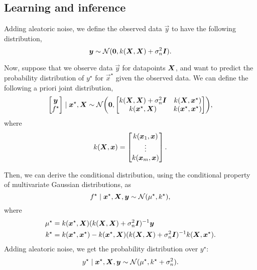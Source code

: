 \subsection{Learning and inference}

Adding aleatoric noise, we define the observed data $\vec{y}$ to have the
following distribution, \[
  \bm{y} \sim \mathcal{N}(\bm{0}, k(\bm{X}, \bm{X}) + \sigma_n^2\bm{I})
.\]

Now, suppose that we observe data $\vec{y}$ for datapoints $\bm{X}$, and want
to predict the probability distribution of $y^\star$ for $\vec{x}^\star$ given
the observed data. We can define the following a priori joint
distribution, \[
  \begin{bmatrix}
    \vec{y} \\
    f^\star
  \end{bmatrix} \mid \vec{x}^\star, \vec{X}
  \sim
  \mathcal{N} \lft(
  \vec{0},
  \begin{bmatrix}
    k(\mat{X},\mat{X}) + \sigma_n^2\mat{I} & k(\mat{X},\vec{x}^\star) \\
    k(\vec{x}^\star,\mat{X}) & k(\vec{x}^\star, \vec{x}^\star)
  \end{bmatrix} \rgt)
,\]
where \[
  k(\bm{X},\bm{x}) = \begin{bmatrix} k(\bm{x}_1,\bm{x}) \\ \vdots \\
  k(\bm{x}_m,\bm{x}) \end{bmatrix}
.\]

Then, we can derive the conditional distribution, using the conditional
property of multivariate Gaussian distributions, as \[
  f^\star \mid \bm{x}^\star, \bm{X}, \bm{y} \sim \mathcal{N}(\mu^\star,k^\star)
,\]
where
\begin{align*}
  \mu^\star &= k(\bm{x}^\star, \bm{X}) (k(\bm{X}, \bm{X})+\sigma_n^2\bm{I})^{-1} \bm{y} \\
  k^\star &= k(\bm{x}^\star,\bm{x}^\star) - k(\bm{x}^\star,\bm{X}) (k(\bm{X},\bm{X})+\sigma_n^2\bm{I})^{-1} k(\bm{X},\bm{x}^\star)
.\end{align*}
Adding aleatoric noise, we get the probability distribution over $y^\star$: \[
  y^\star\mid\bm{x}^\star,\bm{X},\bm{y}\sim\mathcal{N}(\mu^\star,k^\star+\sigma_n^2)
.\]

